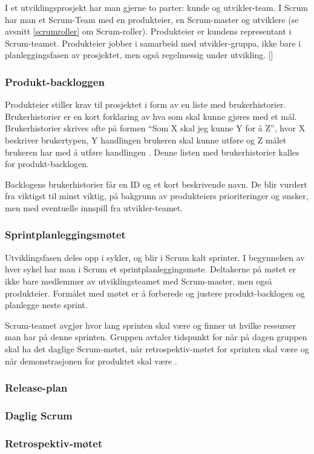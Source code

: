\documentclass[12pt,a4paper,norsk]{article}
\begin{document}
	I et utviklingsprosjekt har man gjerne to parter: kunde og utvikler-team. I Scrum har man et Scrum-Team med en produkteier, en Scrum-master og utviklere (se avsnitt \ref{scrumroller} om Scrum-roller). Produkteier er kundens representant i Scrum-teamet. Produkteier jobber i samarbeid med utvikler-gruppa, ikke bare i planleggingsfasen av prosjektet, men også regelmessig under utvikling.
	[\cite{scrumguides}]
	\subsubsection{Produkt-backloggen}
	Produkteier stiller krav til prosjektet i form av en liste med brukerhistorier. Brukerhistorier er en kort forklaring av hva som skal kunne gjøres med et mål. Brukerhistorier skrives ofte på formen “Som X skal jeg kunne Y for å Z”, hvor X beskriver brukertypen, Y handlingen brukeren skal kunne utføre og Z målet brukeren har med å utføre handlingen \cite[side 9]{kniberg}. Denne listen med brukerhistorier kalles for produkt-backlogen.

    Backlogens brukerhistorier får en ID og et kort beskrivende navn. De blir vurdert fra viktigst til minst viktig, på bakgrunn av produkteiers prioriteringer og ønsker, men med eventuelle innspill fra utvikler-teamet.
	\subsubsection{Sprintplanleggingsmøtet}
	Utviklingsfasen deles opp i sykler, og blir i Scrum kalt sprinter. I begynnelsen av hver sykel har man i Scrum et sprintplanleggingsmøte. Deltakerne på møtet er ikke bare medlemmer av utviklingsteamet med Scrum-master, men også produkteier. Formålet med møtet er å forberede og justere produkt-backlogen og planlegge neste sprint.

    Scrum-teamet avgjør hvor lang sprinten skal være og finner ut hvilke ressurser man har på denne sprinten. Gruppen avtaler tidspunkt for når på dagen gruppen skal ha det daglige Scrum-møtet, når retrospektiv-møtet for sprinten skal være og når demonstrasjonen for produktet skal være \cite[side 16]{kniberg}.
	\subsubsection{Release-plan}\label{releaseplan}
	\subsubsection{Daglig Scrum}
	\subsubsection{Retrospektiv-møtet}
\end{document}
